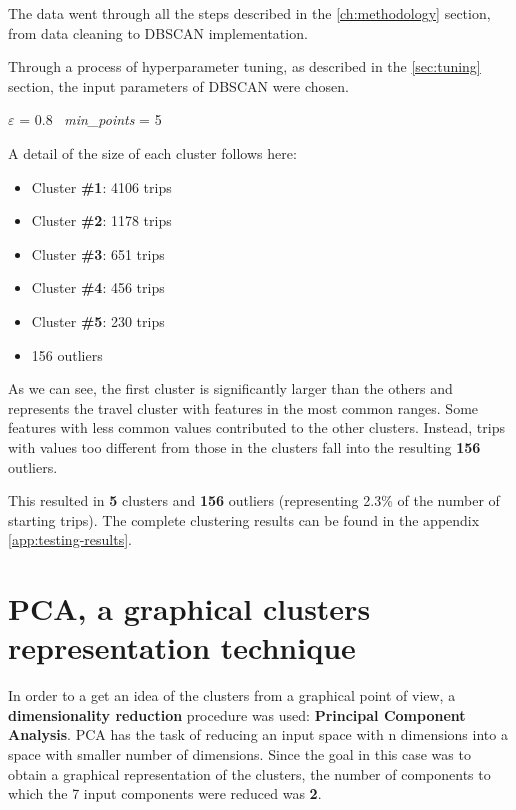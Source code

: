 The data went through all the steps described in the \ref{ch:methodology} section, from data cleaning to DBSCAN implementation.

Through a process of hyperparameter tuning, as described in the \ref{sec:tuning} section, the input parameters of DBSCAN were chosen. 

\begin{center} 
    $\varepsilon$ = 0.8 \, \textit{min\_points} = 5
\end{center} 

A detail of the size of each cluster follows here:
\begin{itemize}
\item Cluster \textbf{\#1}: 4106 trips
\item Cluster \textbf{\#2}: 1178 trips
\item Cluster \textbf{\#3}: 651 trips
\item Cluster \textbf{\#4}: 456 trips
\item Cluster \textbf{\#5}: 230 trips
\item 156 outliers
\end{itemize}

As we can see, the first cluster is significantly larger than the others and represents the travel cluster with features in the most common ranges. Some features with less common values contributed to the other clusters. Instead, trips with values too different from those in the clusters fall into the resulting \textbf{156} outliers.

This resulted in \textbf{5} clusters and \textbf{156} outliers (representing 2.3\% of the number of starting trips). The complete clustering results can be found in the appendix \ref{app:testing-results}.

\clearpage

\section{PCA, a graphical clusters representation technique}
\label{sec:pca}

In order to a get an idea of the clusters from a graphical point of view, a \textbf{dimensionality reduction} procedure was used: \textbf{Principal Component Analysis}.
PCA has the task of reducing an input space with n dimensions into a space with smaller number of dimensions.
Since the goal in this case was to obtain a graphical representation of the clusters, the number of components to which the 7 input components were reduced was \textbf{2}.

